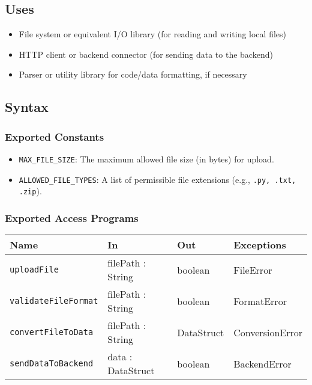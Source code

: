\documentclass[12pt, titlepage]{article}
\begin{document}
\subsection{Uses}

\begin{itemize}
    \item File system or equivalent I/O library (for reading and writing local files)
    \item HTTP client or backend connector (for sending data to the backend)
    \item Parser or utility library for code/data formatting, if necessary
\end{itemize}

\subsection{Syntax}

\subsubsection{Exported Constants}

\begin{itemize}
    \item \texttt{MAX\_FILE\_SIZE}: The maximum allowed file size (in bytes) for upload.
    \item \texttt{ALLOWED\_FILE\_TYPES}: A list of permissible file extensions (e.g., \texttt{.py, .txt, .zip}).
\end{itemize}

\subsubsection{Exported Access Programs}

\begin{center}
\begin{tabular}{p{5cm} p{3.5cm} p{3.5cm} p{2cm}}
\hline
\textbf{Name} & \textbf{In} & \textbf{Out} & \textbf{Exceptions} \\
\hline
\texttt{uploadFile} & filePath : String & boolean & FileError \\
\texttt{validateFileFormat} & filePath : String & boolean & FormatError \\
\texttt{convertFileToData} & filePath : String & DataStruct & ConversionError \\
\texttt{sendDataToBackend} & data : DataStruct & boolean & BackendError \\
\hline
\end{tabular}
\end{center}
\end{document}
